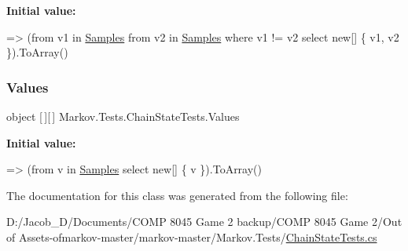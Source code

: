 {\bfseries Initial value\+:}
\begin{DoxyCode}
=>
            (from v1 in \mbox{\hyperlink{class_markov_1_1_tests_1_1_chain_state_tests_ab07b0e6dcc3273b5cd6321278394e79f}{Samples}}
             from v2 in \mbox{\hyperlink{class_markov_1_1_tests_1_1_chain_state_tests_ab07b0e6dcc3273b5cd6321278394e79f}{Samples}}
             where v1 != v2
             select \textcolor{keyword}{new}[] \{ v1, v2 \}).ToArray()
\end{DoxyCode}
\mbox{\label{class_markov_1_1_tests_1_1_chain_state_tests_a057932abae5917bee396f427da7c8262}} 
\subsubsection{\texorpdfstring{Values}{Values}}
{\footnotesize\ttfamily object \mbox{[}$\,$\mbox{]}\mbox{[}$\,$\mbox{]} Markov.\+Tests.\+Chain\+State\+Tests.\+Values\hspace{0.3cm}{\ttfamily [static]}}

{\bfseries Initial value\+:}
\begin{DoxyCode}
=>
            (from v in \mbox{\hyperlink{class_markov_1_1_tests_1_1_chain_state_tests_ab07b0e6dcc3273b5cd6321278394e79f}{Samples}}
             select \textcolor{keyword}{new}[] \{ v \}).ToArray()
\end{DoxyCode}


The documentation for this class was generated from the following file\+:\begin{DoxyCompactItemize}
\item 
D\+:/\+Jacob\+\_\+\+D/\+Documents/\+C\+O\+M\+P 8045 Game 2 backup/\+C\+O\+M\+P 8045 Game 2/\+Out of Assets-\/ofmarkov-\/master/markov-\/master/\+Markov.\+Tests/\mbox{\hyperlink{_chain_state_tests_8cs}{Chain\+State\+Tests.\+cs}}\end{DoxyCompactItemize}
